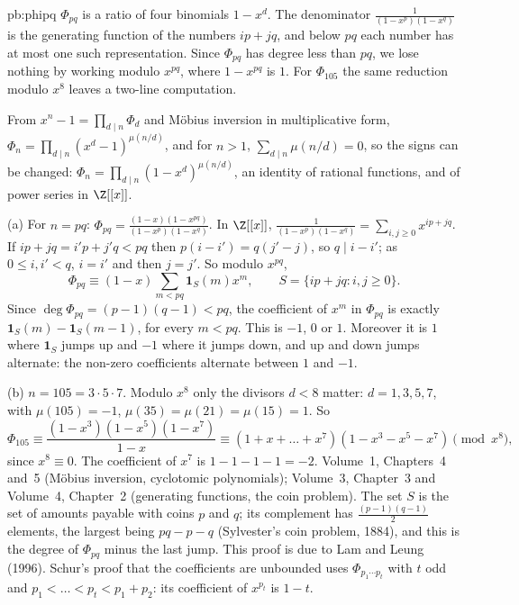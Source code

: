 \begin{solution}{pb:phipq}
\idea $\Phi_{pq}$ is a ratio of four binomials $1-x^d$. The denominator $\frac1{(1-x^p)(1-x^q)}$ is the generating function
of the numbers $ip+jq$, and below $pq$ each number has at most one such representation. Since $\Phi_{pq}$ has degree less
than $pq$, we lose nothing by working modulo $x^{pq}$, where $1-x^{pq}$ is $1$. For $\Phi_{105}$ the same reduction modulo
$x^8$ leaves a two-line computation.

\writeup From $x^n-1=\prod_{d\mid n}\Phi_d$ and Möbius inversion in multiplicative form,
$\Phi_n=\prod_{d\mid n}(x^d-1)^{\mu(n/d)}$, and for $n>1$, $\sum_{d\mid n}\mu(n/d)=0$, so the signs can be changed:
$\Phi_n=\prod_{d\mid n}(1-x^d)^{\mu(n/d)}$, an identity of rational functions, and of power series in $\Z[[x]]$.

(a) For $n=pq$: $\Phi_{pq}=\frac{(1-x)(1-x^{pq})}{(1-x^p)(1-x^q)}$. In $\Z[[x]]$,
$\frac1{(1-x^p)(1-x^q)}=\sum_{i,j\ge0}x^{ip+jq}$. If $ip+jq=i'p+j'q<pq$ then $p(i-i')=q(j'-j)$, so $q\mid i-i'$; as
$0\le i,i'<q$, $i=i'$ and then $j=j'$. So modulo $x^{pq}$,
\[
\Phi_{pq}\equiv(1-x)\sum_{m<pq}\mathbf 1_S(m)x^m,\qquad S=\{ip+jq:i,j\ge0\}.
\]
Since $\deg\Phi_{pq}=(p-1)(q-1)<pq$, the coefficient of $x^m$ in $\Phi_{pq}$ is exactly $\mathbf 1_S(m)-\mathbf 1_S(m-1)$,
for every $m<pq$. This is $-1$, $0$ or $1$. Moreover it is $1$ where $\mathbf 1_S$ jumps up and $-1$ where it jumps down,
and up and down jumps alternate: the non-zero coefficients alternate between $1$ and $-1$.

(b) $n=105=3\cdot5\cdot7$. Modulo $x^8$ only the divisors $d<8$ matter: $d=1,3,5,7$, with $\mu(105)=-1$, $\mu(35)=\mu(21)=\mu(15)
=1$. So
\[
\Phi_{105}\equiv\frac{(1-x^3)(1-x^5)(1-x^7)}{1-x}\equiv(1+x+\dots+x^7)(1-x^3-x^5-x^7)\pmod{x^8},
\]
since $x^8\equiv0$. The coefficient of $x^7$ is $1-1-1-1=-2$.
\tools Volume~1, Chapters~4 and~5 (Möbius inversion, cyclotomic polynomials); Volume~3, Chapter~3 and Volume~4, Chapter~2
(generating functions, the coin problem).
\leads The set $S$ is the set of amounts payable with coins $p$ and $q$; its complement has $\frac{(p-1)(q-1)}2$ elements, the
largest being $pq-p-q$ (Sylvester's coin problem, 1884), and this is the degree of $\Phi_{pq}$ minus the last jump. This
proof is due to Lam and Leung (1996). Schur's proof that the coefficients are unbounded uses $\Phi_{p_1\cdots p_t}$ with
$t$ odd and $p_1<\dots<p_t<p_1+p_2$: its coefficient of $x^{p_t}$ is $1-t$.
\end{solution}

